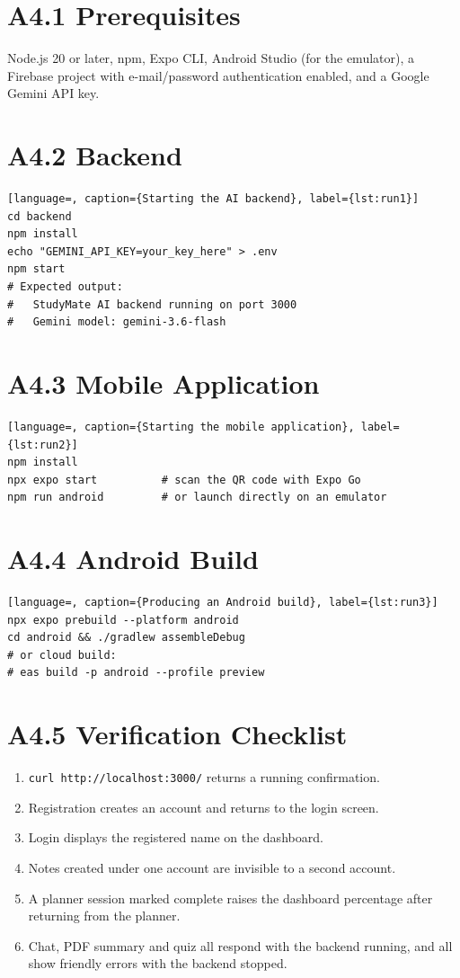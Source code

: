 \documentclass[12pt,a4paper,oneside]{report}
\begin{document}
\section*{A4.1 Prerequisites}
Node.js 20 or later, npm, Expo CLI, Android Studio (for the emulator), a Firebase
project with e-mail/password authentication enabled, and a Google Gemini API key.

\section*{A4.2 Backend}
\begin{lstlisting}[language=, caption={Starting the AI backend}, label={lst:run1}]
cd backend
npm install
echo "GEMINI_API_KEY=your_key_here" > .env
npm start
# Expected output:
#   StudyMate AI backend running on port 3000
#   Gemini model: gemini-3.6-flash
\end{lstlisting}

\section*{A4.3 Mobile Application}
\begin{lstlisting}[language=, caption={Starting the mobile application}, label={lst:run2}]
npm install
npx expo start          # scan the QR code with Expo Go
npm run android         # or launch directly on an emulator
\end{lstlisting}

\section*{A4.4 Android Build}
\begin{lstlisting}[language=, caption={Producing an Android build}, label={lst:run3}]
npx expo prebuild --platform android
cd android && ./gradlew assembleDebug
# or cloud build:
# eas build -p android --profile preview
\end{lstlisting}

\section*{A4.5 Verification Checklist}
\begin{enumerate}[leftmargin=*, itemsep=1pt]
  \item \texttt{curl http://localhost:3000/} returns a running confirmation.
  \item Registration creates an account and returns to the login screen.
  \item Login displays the registered name on the dashboard.
  \item Notes created under one account are invisible to a second account.
  \item A planner session marked complete raises the dashboard percentage after
        returning from the planner.
  \item Chat, PDF summary and quiz all respond with the backend running, and all
        show friendly errors with the backend stopped.
\end{enumerate}
\end{document}
